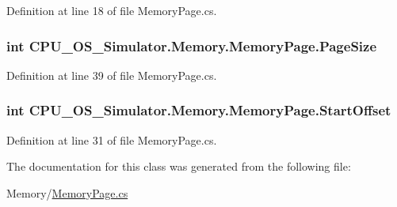 Definition at line 18 of file Memory\+Page.\+cs.

\hypertarget{class_c_p_u___o_s___simulator_1_1_memory_1_1_memory_page_a6fba0e419e59c58fb3c5444a8e437ab3}{}
\subsubsection[{Page\+Size}]{\setlength{\rightskip}{0pt plus 5cm}int C\+P\+U\+\_\+\+O\+S\+\_\+\+Simulator.\+Memory.\+Memory\+Page.\+Page\+Size\hspace{0.3cm}{\ttfamily [get]}}\label{class_c_p_u___o_s___simulator_1_1_memory_1_1_memory_page_a6fba0e419e59c58fb3c5444a8e437ab3}


Definition at line 39 of file Memory\+Page.\+cs.

\hypertarget{class_c_p_u___o_s___simulator_1_1_memory_1_1_memory_page_ad700979e51dd3d05470c681588c6fa79}{}
\subsubsection[{Start\+Offset}]{\setlength{\rightskip}{0pt plus 5cm}int C\+P\+U\+\_\+\+O\+S\+\_\+\+Simulator.\+Memory.\+Memory\+Page.\+Start\+Offset\hspace{0.3cm}{\ttfamily [get]}}\label{class_c_p_u___o_s___simulator_1_1_memory_1_1_memory_page_ad700979e51dd3d05470c681588c6fa79}


Definition at line 31 of file Memory\+Page.\+cs.



The documentation for this class was generated from the following file\+:\begin{DoxyCompactItemize}
\item 
Memory/\hyperlink{_memory_page_8cs}{Memory\+Page.\+cs}\end{DoxyCompactItemize}
